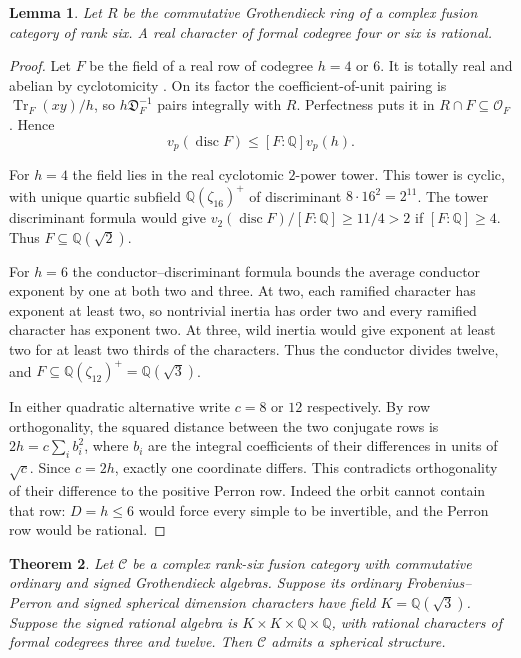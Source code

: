 \documentclass[11pt,reqno]{amsart}
\newtheorem{theorem}{Theorem}[section]
\newtheorem{lemma}[theorem]{Lemma}
\theoremstyle{remark}\newtheorem{remark}[theorem]{Remark}
\numberwithin{equation}{section}
\begin{document}
\begin{lemma}\label{lem:real-four-six}
Let $R$ be the commutative Grothendieck ring of a complex fusion
category of rank six. A real character of formal codegree four or six
is rational.
\end{lemma}
\begin{proof}
Let $F$ be the field of a real row of codegree $h=4$ or $6$.
It is totally real and abelian by cyclotomicity
\cite[Theorem~8.51]{ENO}. On its factor the coefficient-of-unit
pairing is $\operatorname{Tr}_F(xy)/h$, so $h\mathfrak D_F^{-1}$
pairs integrally with $R$. Perfectness puts it in
$R\cap F\subseteq\mathcal O_F$. Hence
\[
      v_p(\operatorname{disc} F)\le [F:\mathbb Q]v_p(h).
\]

For $h=4$ the field lies in the real cyclotomic $2$-power tower.
This tower is cyclic, with unique quartic subfield
$\mathbb Q(\zeta_{16})^+$ of discriminant $8\cdot16^2=2^{11}$.
The tower discriminant formula would give
$v_2(\operatorname{disc}F)/[F:\mathbb Q]\ge11/4>2$ if
$[F:\mathbb Q]\ge4$. Thus $F\subseteq\mathbb Q(\sqrt2)$.

For $h=6$ the conductor--discriminant formula bounds the average
conductor exponent by one at both two and three. At two, each
ramified character has exponent at least two, so nontrivial inertia
has order two and every ramified character has exponent two.
At three, wild inertia would give exponent at least two for at least
two thirds of the characters. Thus the conductor divides twelve,
and $F\subseteq\mathbb Q(\zeta_{12})^+=\mathbb Q(\sqrt3)$.

In either quadratic alternative write $c=8$ or $12$ respectively.
By row orthogonality, the squared distance between the two
conjugate rows is $2h=c\sum_i b_i^2$, where $b_i$ are the integral
coefficients of their differences in units of $\sqrt c$.
Since $c=2h$, exactly one coordinate differs. This contradicts
orthogonality of their difference to the positive Perron row.
Indeed the orbit cannot contain that row: $D=h\le6$ would force
every simple to be invertible, and the Perron row would be rational.
\end{proof}

\begin{theorem}\label{thm:twelve-3-12}
Let $\mathcal C$ be a complex rank-six fusion category with commutative ordinary and signed Grothendieck algebras. Suppose its ordinary Frobenius--Perron and signed spherical dimension characters have field $K=\mathbb Q(\sqrt3)$. Suppose the signed rational algebra is $K\times K\times\mathbb Q\times\mathbb Q$, with rational characters of formal codegrees three and twelve. Then $\mathcal C$ admits a spherical structure.
\end{theorem}
\end{document}
